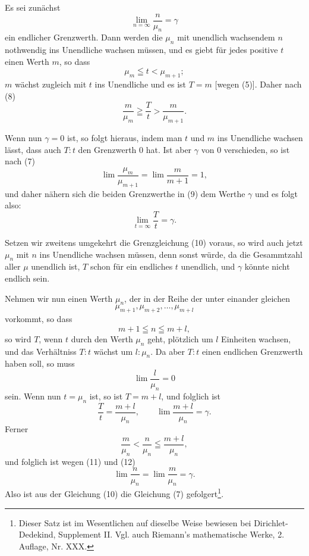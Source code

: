 \documentclass[11pt]{article}
\begin{document}
Es sei zunächst
\begin{equation}
\lim_{n=\infty}\frac{n}{\mu_n}=\gamma
\tag{7}
\end{equation}
ein endlicher Grenzwerth. Dann werden die $\mu_n$ mit unendlich wachsendem $n$ nothwendig ins Unendliche wachsen müssen, und es giebt für jedes positive $t$ einen Werth $m$, so dass
\begin{equation}
\mu_m\leqq t<\mu_{m+1};
\tag{8}
\end{equation}
$m$ wächst zugleich mit $t$ ins Unendliche und es ist $T=m$ [wegen (5)]. Daher nach (8)
\begin{equation}
\frac{m}{\mu_m}\geqq\frac{T}{t}>\frac{m}{\mu_{m+1}} .
\tag{9}
\end{equation}

Wenn nun $\gamma=0$ ist, so folgt hieraus, indem man $t$ und $m$ ins Unendliche wachsen lässt, dass auch $T:t$ den Grenzwerth $0$ hat. Ist aber $\gamma$ von $0$ verschieden, so ist nach (7)
\[
\lim\frac{\mu_m}{\mu_{m+1}}=\lim\frac{m}{m+1}=1,
\]
und daher nähern sich die beiden Grenzwerthe in (9) dem Werthe $\gamma$ und es folgt also:
\begin{equation}
\lim_{t=\infty}\frac{T}{t}=\gamma.
\tag{10}
\end{equation}

Setzen wir zweitens umgekehrt die Grenzgleichung (10) voraus, so wird auch jetzt $\mu_n$ mit $n$ ins Unendliche wachsen müssen, denn sonst würde, da die Gesammtzahl aller $\mu$ unendlich ist, $T$ schon für ein endliches $t$ unendlich, und $\gamma$ könnte nicht endlich sein.

Nehmen wir nun einen Werth $\mu_n$, der in der Reihe der unter einander gleichen
\[
\mu_{m+1},\mu_{m+2},\ldots,\mu_{m+l}
\]
vorkommt, so dass
\[
m+1\leqq n\leqq m+l,
\]
so wird $T$, wenn $t$ durch den Werth $\mu_n$ geht, plötzlich um $l$ Einheiten wachsen, und das Verhältniss $T:t$ wächst um $l:\mu_n$. Da aber $T:t$ einen endlichen Grenzwerth haben soll, so muss
\begin{equation}
\lim\frac{l}{\mu_n}=0
\tag{11}
\end{equation}
sein. Wenn nun $t=\mu_n$ ist, so ist $T=m+l$, und folglich ist
\begin{equation}
\frac{T}{t}=\frac{m+l}{\mu_n},\qquad
\lim\frac{m+l}{\mu_n}=\gamma.
\tag{12}
\end{equation}
Ferner
\[
\frac{m}{\mu_n}<\frac{n}{\mu_n}\leqq\frac{m+l}{\mu_n},
\]
und folglich ist wegen (11) und (12)
\[
\lim\frac{n}{\mu_n}=\lim\frac{m}{\mu_n}=\gamma.
\]
Also ist aus der Gleichung (10) die Gleichung (7) gefolgert\footnote{Dieser Satz ist im Wesentlichen auf dieselbe Weise bewiesen bei Dirichlet-Dedekind, Supplement II. Vgl. auch Riemann's mathematische Werke, 2. Auflage, Nr. XXX.}.
\end{document}
